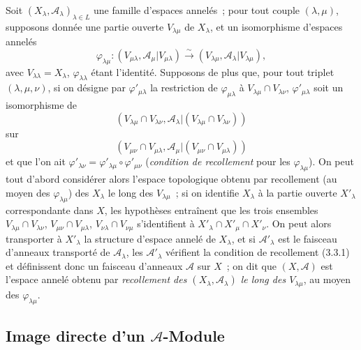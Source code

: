 \begin{env}[4.1.7]
\label{0.4.1.7-fr}
Soit $(X_\lambda,\mathcal{A}_\lambda)_{\lambda\in L}$ une famille d'espaces
annelés~; pour tout couple $(\lambda,\mu)$, supposons donnée une partie ouverte
$V_{\lambda\mu}$ de $X_\lambda$, et un isomorphisme d'espaces annelés
\[
  \varphi_{\lambda\mu}:
  (V_{\mu\lambda},\mathcal{A}_\mu|V_{\mu\lambda})
  \xrightarrow{\sim}
  (V_{\lambda\mu},\mathcal{A}_\lambda|V_{\lambda\mu}),
\]
avec $V_{\lambda\lambda}=X_\lambda$, $\varphi_{\lambda\lambda}$ étant
l'identité. Supposons de plus que, pour tout triplet $(\lambda,\mu,\nu)$, si
on désigne par $\varphi'_{\mu\lambda}$ la restriction de
$\varphi_{\mu\lambda}$ à $V_{\lambda\mu}\cap V_{\lambda\nu}$,
$\varphi'_{\mu\lambda}$ soit un isomorphisme de
\[
  (V_{\lambda\mu}\cap V_{\lambda\nu},
   \mathcal{A}_\lambda|(V_{\lambda\mu}\cap V_{\lambda\nu}))
\]
sur
\[
  (V_{\mu\nu}\cap V_{\mu\lambda},
   \mathcal{A}_\mu|(V_{\mu\nu}\cap V_{\mu\lambda}))
\]
et que l'on ait
$\varphi'_{\lambda\nu}=\varphi'_{\lambda\mu}\circ\varphi'_{\mu\nu}$
(\emph{condition de recollement} pour les $\varphi_{\lambda\mu}$). On peut
tout d'abord considérer alors l'espace topologique obtenu par recollement (au
moyen des $\varphi_{\lambda\mu}$) des $X_\lambda$
le long des $V_{\lambda\mu}$~; si on identifie $X_\lambda$ à la partie ouverte
$X'_\lambda$ correspondante dans $X$, les hypothèses entraînent que les trois
ensembles $V_{\lambda\mu}\cap V_{\lambda\nu}$,
$V_{\mu\nu}\cap V_{\mu\lambda}$,
$V_{\nu\lambda}\cap V_{\nu\mu}$ s'identifient à
$X'_\lambda\cap X'_\mu\cap X'_\nu$. On peut alors transporter à
$X'_\lambda$ la structure d'espace annelé de $X_\lambda$, et si
$\mathcal{A}'_\lambda$ est le faisceau d'anneaux transporté de
$\mathcal{A}_\lambda$, les $\mathcal{A}'_\lambda$ vérifient la condition de
recollement (3.3.1) et définissent donc un faisceau d'anneaux $\mathcal{A}$ sur
$X$~; on dit que $(X,\mathcal{A})$ est l'espace annelé obtenu par
\emph{recollement des $(X_\lambda,\mathcal{A}_\lambda)$ le long des
$V_{\lambda\mu}$}, au moyen des $\varphi_{\lambda\mu}$.
\end{env}

\subsection{Image directe d'un $\mathcal{A}$-Module}
\label{subsection:0.4.2-fr}

